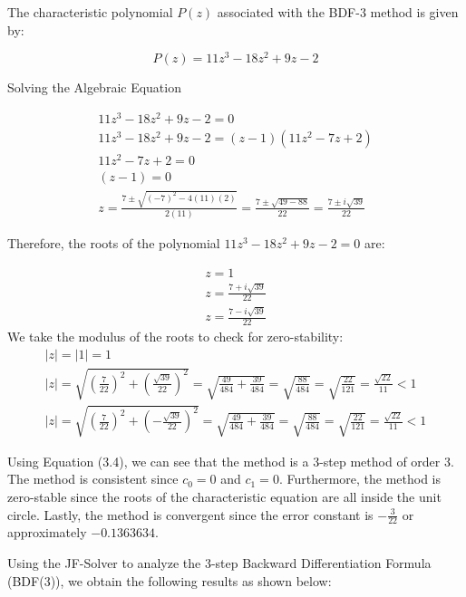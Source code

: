 The characteristic polynomial \(P(z)\) associated with the BDF-3 method is given by:

\begin{equation}
    P(z) = 11z^3 - 18z^2 + 9z - 2  
\end{equation}



Solving the Algebraic Equation 

\begin{eqnarray}
    11z^3 - 18z^2 + 9z - 2 = 0 \\
    11z^3 - 18z^2 + 9z - 2 = (z - 1)(11z^2 - 7z + 2) \\    
    11z^2 - 7z + 2 = 0 \\
    (z - 1) = 0 \\
    z = \frac{7 \pm \sqrt{(-7)^2 - 4(11)(2)}}{2(11)} = \frac{7 \pm \sqrt{49 - 88}}{22} = \frac{7 \pm i\sqrt{39}}{22} 
\end{eqnarray}

Therefore, the roots of the polynomial \(11z^3 - 18z^2 + 9z - 2 = 0\) are:

\begin{eqnarray}
    z = 1 \\
    z = \frac{7 + i\sqrt{39}}{22} \\
    z = \frac{7 - i\sqrt{39}}{22}
\end{eqnarray}
We take the modulus of the roots to check for zero-stability:
\begin{eqnarray}
    |z| = |1| = 1 \\
    |z| = \sqrt{\left(\frac{7}{22}\right)^2 + \left(\frac{\sqrt{39}}{22}\right)^2} = \sqrt{\frac{49}{484} + \frac{39}{484}} = \sqrt{\frac{88}{484}} = \sqrt{\frac{22}{121}} = \frac{\sqrt{22}}{11} < 1 \\
    |z| = \sqrt{\left(\frac{7}{22}\right)^2 + \left(-\frac{\sqrt{39}}{22}\right)^2} = \sqrt{\frac{49}{484} + \frac{39}{484}} = \sqrt{\frac{88}{484}} = \sqrt{\frac{22}{121}} = \frac{\sqrt{22}}{11} < 1
\end{eqnarray}

Using Equation (3.4), we can see that the method is a 3-step method of order 3. The method is consistent since \(c_0 = 0\) and \(c_1 = 0\). Furthermore, the method is zero-stable since the roots of the characteristic equation are all inside the unit circle. Lastly, the method is convergent since the error constant is \(-\frac{3}{22}\) or approximately \(-0.1363634\).

Using the JF-Solver to analyze the 3-step Backward Differentiation Formula (BDF(3)), we obtain the following results as shown below:

